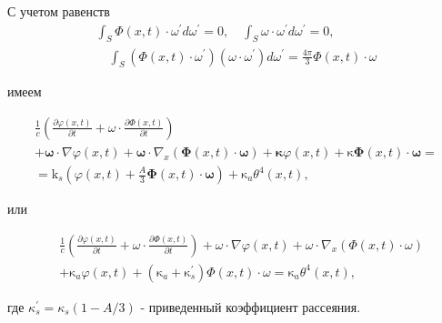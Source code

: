 С учетом равенств
\begin{gather*}
    \int_{S} \Phi(x, t) \cdot \omega^{\prime} d \omega^{\prime} = 0,
    \quad \int_{S} \omega \cdot \omega^{\prime} d \omega^{\prime} = 0, \\
    \quad \int_{S}\left(\Phi(x, t) \cdot \omega^{\prime}\right)\left(\omega \cdot
    \omega^{\prime}\right) d \omega^{\prime}=\frac{4 \pi}{3} \Phi(x, t) \cdot \omega
\end{gather*}

имеем

\begin{gather*}
    \frac{1}{c}\left(\frac{\partial \varphi(x, t)}{\partial t}
    + \omega \cdot \frac{\partial \Phi(x, t)}{\partial t}\right) \\
    + \boldsymbol{\omega} \cdot \nabla \varphi(x, t)
    + \boldsymbol{\omega} \cdot \nabla_{x}
    (\boldsymbol{\Phi}(x, t) \cdot \boldsymbol{\omega})
    + \boldsymbol{\kappa} \varphi(x, t)+\mathrm{\kappa}
    \boldsymbol{\Phi}(x, t) \cdot \boldsymbol{\omega} = \\
    = \mathrm{k}_{s}\left(\varphi(x, t)+\frac{A}{3} \boldsymbol{\Phi}(x, t) \cdot
    \boldsymbol{\omega}\right)+\mathrm{\kappa}_{a} \theta^{4}(x, t),
\end{gather*}

или

\begin{equation}
    \label{eq:1_2:17}
    \begin{aligned}
        &\frac{1}{c}\left(\frac{\partial \varphi(x, t)}{\partial t}
        + \omega \cdot \frac{\partial \Phi(x, t)}{\partial t}\right)
        + \omega \cdot \nabla \varphi(x, t)
        + \omega \cdot \nabla_{x}(\Phi(x, t) \cdot \omega) \\
        &+ \mathrm{\kappa}_{a} \varphi(x, t)+\left(\mathrm{\kappa}_{a}
        + \mathrm{\kappa}_{s}^{\prime}\right)
        \Phi(x, t) \cdot \omega = \mathrm{\kappa}_{a} \theta^{4}(x, t),
    \end{aligned}
\end{equation}

где $\kappa_{s}^{\prime}=\kappa_{s}(1-A / 3)$ - приведенный коэффициент рассеяния.



